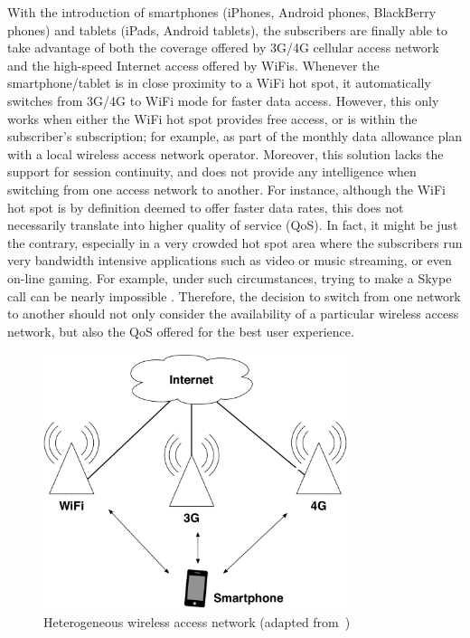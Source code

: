 With the introduction of smartphones (iPhones, Android phones, BlackBerry phones) and tablets (iPads, Android tablets), the subscribers are finally able to take advantage of both the coverage offered by 3G/4G cellular access network and the high-speed Internet access offered by WiFis. Whenever the smartphone/tablet is in close proximity to a WiFi hot spot, it automatically switches from 3G/4G to WiFi mode for faster data access. However, this only works when either the WiFi hot spot provides free access, or is within the subscriber's subscription; for example, as part of the monthly data allowance plan with a local wireless access network operator. Moreover, this solution lacks the support for session continuity, and does not provide any intelligence when switching from one access network to another. For instance, although the WiFi hot spot is by definition deemed to offer faster data rates, this does not necessarily translate into higher quality of service (QoS). In fact, it might be just the contrary, especially in a very crowded hot spot area where the subscribers run very bandwidth intensive applications such as video or music streaming, or even on-line gaming. For example, under such circumstances, trying to make a Skype call can be nearly impossible \cite{Wisely4gWLAN09}. Therefore, the decision to switch from one network to another should not only consider the availability of a particular wireless access network, but also the QoS offered for the best user experience.

\begin{figure}[t]
    \centering
    \includegraphics[width=3.5in]{Intelligent/Figures/heterogeneous}
    \caption{Heterogeneous wireless access network (adapted from~\cite{HossainBeaubrun09})}
    \label{fig:heterogeneous_intelligent}
\end{figure}

